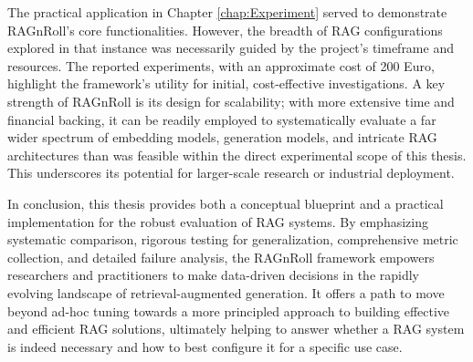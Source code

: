 The practical application in Chapter \ref{chap:Experiment} served to demonstrate RAGnRoll's core functionalities. However, the breadth of RAG configurations explored in that instance was necessarily guided by the project's timeframe and resources. The reported experiments, with an approximate cost of 200 Euro, highlight the framework's utility for initial, cost-effective investigations. A key strength of RAGnRoll is its design for scalability; with more extensive time and financial backing, it can be readily employed to systematically evaluate a far wider spectrum of embedding models, generation models, and intricate RAG architectures than was feasible within the direct experimental scope of this thesis. This underscores its potential for larger-scale research or industrial deployment.

In conclusion, this thesis provides both a conceptual blueprint and a practical implementation for the robust evaluation of RAG systems. By emphasizing systematic comparison, rigorous testing for generalization, comprehensive metric collection, and detailed failure analysis, the RAGnRoll framework empowers researchers and practitioners to make data-driven decisions in the rapidly evolving landscape of retrieval-augmented generation. It offers a path to move beyond ad-hoc tuning towards a more principled approach to building effective and efficient RAG solutions, ultimately helping to answer whether a RAG system is indeed necessary and how to best configure it for a specific use case.